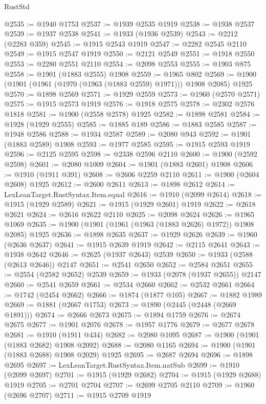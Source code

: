 \begin{lexlean}{RustStd}
\begin{coremodule}
{\begin{coremodule}
{{{{{{{{{{{{{{{{{{{{{{{{{{{{{{{{{{{{{{{{{{{@2535 := @1940 @1753
@2537 := @1939 @2535 @1919
@2538 := @1938 @2537
@2539 := @1937 @2538
@2541 := @1933 (@1936 @2539)
@2543 := @2212 (@2283 @359)
@2545 := @1915 @2543 @1919
@2547 := @2282 @2545 @2110
@2549 := @1915 @2547 @1919
@2550 := @2121 @2549
@2551 := @1918 @2550
@2553 := @2280 @2551 @2110
@2554 := @2098 @2553
@2555 := @1903 @875
@2558 := @1901 (@1883 @2555) @1908
@2559 := @1965 @802
@2569 := @1900 (@1901 (@1961 (@1970 (@1963 (@1883 @2559) @1971))) @1908 @2085) @1925
@2570 := @1898 @2569
@2571 := @1929 @2559
@2573 := @1960 (@2570 @2571)
@2575 := @1915 @2573 @1919
@2576 := @1918 @2575
@2578 := @2302 @2576 @1818
@2581 := @1900 (@2558 @2578) @1925
@2582 := @1898 @2581
@2584 := @1928 (@1929 @2555)
@2585 := @1885 @189
@2586 := @1883 @2585
@2587 := @1948 @2586
@2588 := @1934 @2587
@2589 := @2080 @943
@2592 := @1901 (@1883 @2589) @1908
@2593 := @1977 @2585
@2595 := @1915 @2593 @1919
@2596 := @2125 @2595
@2598 := @2338 @2596 @2110
@2600 := @1900 (@2592 @2598)
@2601 := @2080 @1009
@2604 := @1901 (@1883 @2601) @1908
@2606 := @1910 (@1911 @391)
@2608 := @2606 @2259 @2110
@2611 := @1900 (@2604 @2608) @1925
@2612 := @2600 @2611
@2613 := @1898 @2612
@2614 := LexLeanTarget.RustSyntax.Item.equal
@2616 := @1910 (@2099 @2614)
@2618 := @1915 (@1929 @2589)
@2621 := @1915 (@1929 @2601) @1919
@2622 := @2618 @2621
@2624 := @2616 @2622 @2110
@2625 := @2098 @2624
@2626 := @1965 @1069
@2635 := @1900 (@1901 (@1961 (@1963 (@1883 @2626) @1972)) @1908 @2085) @1925
@2636 := @1898 @2635
@2637 := @1929 @2626
@2639 := @1960 (@2636 @2637)
@2641 := @1915 @2639 @1919
@2642 := @2115 @2641
@2643 := @1938 @2642
@2646 := @2625 (@1937 @2643) @2539
@2650 := @1933 (@2588 (@2613 @2646)) @2147
@2651 := @2541 @2650
@2652 := @2584 @2651
@2655 := @2554 (@2582 @2652) @2539
@2659 := @1933 (@2078 (@1937 @2655)) @2147
@2660 := @2541 @2659
@2661 := @2534 @2660
@2662 := @2532 @2661
@2664 := @1742 (@2454 @2662)
@2666 := @1874 (@1877 @105)
@2667 := @1882 @1989
@2669 := @1881 (@2667 @1753)
@2673 := @1890 (@2445 (@2448 (@2669 @1891)))
@2674 := @2666 @2673
@2675 := @1894 @1759
@2676 := @2674 @2675
@2677 := @1901 @2076
@2678 := @1957 @1776
@2679 := @2677 @2678
@2681 := @1910 (@1911 @434)
@2682 := @2080 @1095
@2687 := @1900 (@1901 (@1883 @2682) @1908 @2092)
@2688 := @2080 @1165
@2694 := @1900 (@1901 (@1883 @2688) @1908 @2029) @1925
@2695 := @2687 @2694
@2696 := @1898 @2695
@2697 := LexLeanTarget.RustSyntax.Item.natSub
@2699 := @1910 (@2099 @2697)
@2701 := @1915 (@1929 @2682)
@2704 := @1915 (@1929 @2688) @1919
@2705 := @2701 @2704
@2707 := @2699 @2705 @2110
@2709 := @1960 (@2696 @2707)
@2711 := @1915 @2709 @1919
}}}}}}}}}}}}}}}}}}}}}}}}}}}}}}}}}}}}}}}}}}}
\end{coremodule}}
\end{coremodule}
\end{lexlean}
